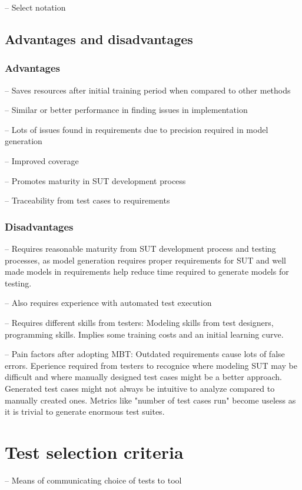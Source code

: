 -- Select notation

\subsection{Advantages and disadvantages}

\subsubsection{Advantages}
-- Saves resources after initial training period when compared to other methods

-- Similar or better performance in finding issues in implementation

-- Lots of issues found in requirements due to precision required in model generation

-- Improved coverage

-- Promotes maturity in SUT development process

-- Traceability from test cases to requirements

\subsubsection{Disadvantages}
-- Requires reasonable maturity from SUT development process and testing processes, as model generation requires proper requirements for SUT and well made models in requirements help reduce time required to generate models for testing.

-- Also requires experience with automated test execution

-- Requires different skills from testers: Modeling skills from test designers, programming skills. Implies some training costs and an initial learning curve.

-- Pain factors after adopting MBT: Outdated requirements cause lots of false errors. Eperience required from testers to recognice where modeling SUT may be difficult and where manually designed test cases might be a better approach. Generated test cases might not always be intuitive to analyze compared to manually created ones. Metrics like "number of test cases run" become useless as it is trivial to generate enormous test suites.

\section{Test selection criteria}
-- Means of communicating choice of tests to tool

